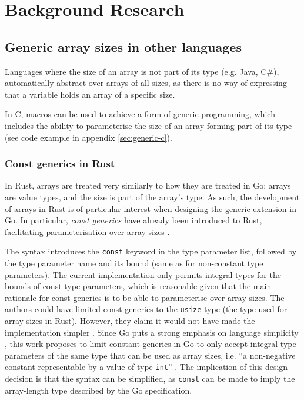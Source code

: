 \section{Background Research}
\label{ch:background-research}

\subsection{Generic array sizes in other languages}

Languages where the size of an array is not part of its type (e.g. Java, C\#),
automatically abstract over arrays of all sizes, as there is no way of
expressing that a variable holds an array of a specific size.

In C, macros can be used to achieve a form of generic programming, which
includes the ability to parameterise the size of an array forming part of its
type (see code example in appendix \ref{sec:generic-c}).

\subsubsection{Const generics in Rust}

In Rust, arrays are treated very similarly to how they are treated in Go: arrays
are value types, and the size is part of the array's type. As such, the
development of arrays in Rust is of particular interest when designing the
generic extension in Go. In particular, \emph{const generics} have already been
introduced to Rust, facilitating parameterisation over array sizes
\autocite{rustConstBlog}.

The syntax introduces the \texttt{const} keyword in the type parameter list,
followed by the type parameter name and its bound (same as for non-constant type
parameters). The current implementation only permits integral types for the
bounds of const type parameters, which is reasonable given that the main
rationale for const generics is to be able to parameterise over array sizes. The
authors could have limited const generics to the \texttt{usize} type (the type
used for array sizes in Rust). However, they claim it would not have made the
implementation simpler \autocite{rustConstRFC}. Since Go puts a strong emphasis
on language simplicity \autocite{goSimplicity}, this work proposes to limit
constant generics in Go to only accept integral type parameters of the same type
that can be used as array sizes, i.e. ``a non-negative constant representable by
a value of type \texttt{int}'' \autocite{spec}. The implication of this design
decision is that the syntax can be simplified, as \texttt{const} can be made to
imply the array-length type described by the Go specification.

